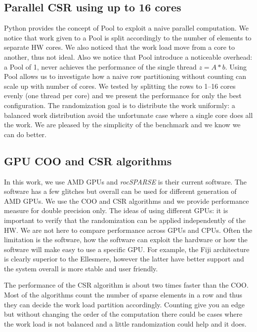 \documentclass[manuscript,screen]{acmart}
\begin{document}
\subsection{Parallel CSR using up to 16 cores}
\label{sec:parcpu}
Python provides the concept of Pool to exploit a naive parallel
computation. We notice that work given to a Pool is split accordingly
to the number of elements to separate HW cores. We also noticed that
the work load move from a core to another, thus not ideal. Also we
notice that Pool introduce a noticeable overhead: a Pool of 1, never
achieves the performance of the single thread $z = A*b$. Using Pool
allows us to investigate how a naive row partitioning without counting
can scale up with number of cores. We tested by splitting the rows to
1--16 cores evenly (one thread per core) and we present the
performance for only the best configuration. The randomization goal is to
distribute the work uniformly: a balanced work distribution avoid the
unfortunate case where a single core does all the work. We are pleased
by the simplicity of the benchmark and we know we can do better.



\subsection{GPU COO and CSR algorithms}
\label{sec:gpucoocsr}
In this work, we use AMD GPUs and {\em rocSPARSE} is their current
software. The software has a few glitches but overall can be used for
different generation of AMD GPUs. We use the COO and CSR algorithms
and we provide performance measure for double precision only. The
ideas of using different GPUs: it is important to verify that the
randomization can be applied independently of the HW. We are not here
to compare performance across GPUs and CPUs. Often the limitation is
the software, how the software can exploit the hardware or how the
software will make easy to use a specific GPU. For example, the Fiji
architecture is clearly superior to the Ellesmere, however the latter
have better support and the system overall is more stable and user
friendly.

The performance of the CSR algorithm is about two times faster than the
COO. Most of the algorithms count the number of sparse elements in a
row and thus they can decide the work load partition
accordingly. Counting give you an edge but without changing the order
of the computation there could be cases where the work load is not
balanced and a little randomization could help and it does.
\end{document}
